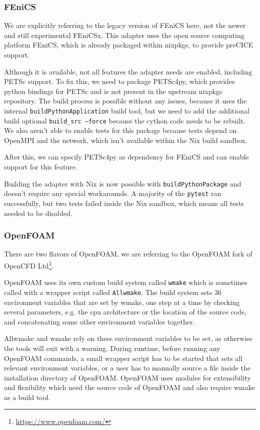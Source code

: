 \documentclass[conference,final,a4paper]{IEEEtran}
\begin{document}
\subsubsection{FEniCS}

We are explicitly referring to the legacy version of FEniCS here, not the newer and still experimental FEniCSx.
This adapter uses the open source computing platform FEniCS, which is already packaged within nixpkgs, to provide preCICE support.

Although it is available, not all features the adapter needs are enabled, including PETSc support.
To fix this, we need to package PETSc4py, which provides python bindings for PETSc and is not present in the upstream nixpkgs repository.
The build process is possible without any issues, because it uses the internal \texttt{buildPythonApplication} build tool, but we need to add the additional build optional \texttt{build\_src --force} because the cython code needs to be rebuilt.
We also aren't able to enable tests for this package because tests depend on OpenMPI and the network, which isn't available within the Nix build sandbox.

After this, we can specify PETSc4py as dependency for FEniCS and can enable support for this feature.

Building the adapter with Nix is now possible with \texttt{buildPythonPackage} and doesn't require any special workarounds.
A majority of the \texttt{pytest} ran successfully, but two tests failed inside the Nix sandbox, which means all tests needed to be disabled.\\

\subsubsection{OpenFOAM}

There are two flavors of OpenFOAM, we are referring to the OpenFOAM fork of OpenCFD Ltd\footnote{\url{https://www.openfoam.com/}}.

OpenFOAM uses its own custom build system called \texttt{wmake} which is sometimes called with a wrapper script called \texttt{Allwmake}.
The build system sets 36 environment variables that are set by wmake, one step at a time by checking several parameters, e.g. the cpu architecture or the location of the source code, and concatenating some other environment variables together.

Allwmake and wmake rely on these environment variables to be set, as otherwise the tools will exit with a warning.
During runtime, before running any OpenFOAM commands, a small wrapper script has to be started that sets all relevant environment variables, or a user has to manually source a file inside the installation directory of OpenFOAM.
OpenFOAM uses modules for extensibility and flexibility which need the source code of OpenFOAM and also require wmake as a build tool.
\end{document}
